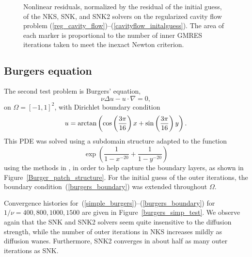 \begin{figure}
{    \label{cavityflow_1000}
  } 
  \caption{Nonlinear residuals, normalized by the residual of the initial guess, of the NKS, SNK, and SNK2 solvers on the regularized cavity flow problem (\ref{reg_cavity_flow})--(\ref{cavityflow_initalguess}). The area of each marker is proportional to the number of inner GMRES iterations taken to meet the inexact Newton criterion.}
  \label{reg_cavity_flow_residuals}
\end{figure}

\subsection{Burgers equation}
\label{sec:burgers}

The second test problem is Burgers' equation,
\begin{equation}
  \nu \Delta u - u \cdot \nabla = 0,
  \label{simple_burgers}	
\end{equation}
on $\Omega = [-1,1]^2$, with Dirichlet boundary condition
\begin{equation}
  u = \arctan \left( \cos \left( \frac{3 \pi}{16} \right) x +\sin \left( \frac{3 \pi}{16} \right) y \right).
  \label{burgers_boundary}
\end{equation}
This PDE was solved using a subdomain structure adapted to the function 
\[
  \exp\left( \frac{1}{1-x^{-20}} + \frac{1}{1-y^{-20}} \right)
\]
using the methods in \cite{AitonTA}, in order to help capture the boundary layers, as shown in Figure~\ref{Burger_patch_structure}. For the initial guess of the outer iterations, the boundary condition~(\ref{burgers_boundary}) was extended throughout $\Omega$.

Convergence histories for~(\ref{simple_burgers})--(\ref{burgers_boundary}) for $1/\nu = 400,800,1000,1500$ are given in Figure~\ref{burgers_simp_test}. We observe again that the SNK and SNK2 solvers seem quite insensitive to the diffusion strength, while the number of outer iterations in NKS increases mildly as diffusion wanes. Furthermore, SNK2 converges in about half as many outer iterations as SNK. 


